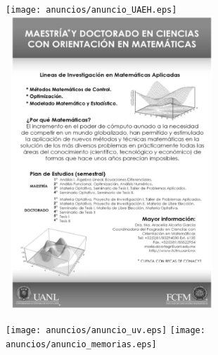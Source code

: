 \newpage
\thispagestyle{empty}


\texttt{[image: anuncios/anuncio\_UAEH.eps]}
\hspace{1cm}
\includegraphics[width=8cm,height=11cm]{otros/POSTER-UANL.eps}
\begin{center}
\texttt{[image: anuncios/anuncio\_uv.eps]}
\texttt{[image: anuncios/anuncio\_memorias.eps]}
\end{center}
